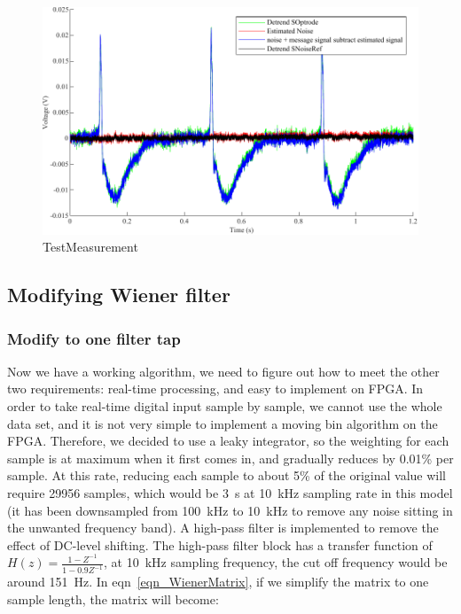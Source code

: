 \begin{figure}[h]
\centering
\includegraphics[width=1\linewidth]{4-ANC_Sys/TestMeasurement.pdf}
\caption{TestMeasurement}
\label{fig_TestMeasurement}
\end{figure}

\subsection{Modifying Wiener filter}

\subsubsection{Modify to one filter tap}

Now we have a working algorithm, we need to figure out how to meet the other two requirements: real-time processing, and easy to implement on FPGA.  In order to take real-time digital input sample by sample, we cannot use the whole data set, and it is not very simple to implement a moving bin algorithm on the FPGA.  Therefore, we decided to use a leaky integrator, so the weighting for each sample is at maximum when it first comes in, and gradually reduces by 0.01\% per sample.  At this rate, reducing each sample to about 5\% of the original value will require 29956 samples, which would be \qty{3}{s} at \qty{10}{kHz} sampling rate in this model (it has been downsampled from \qty{100}{kHz} to \qty{10}{kHz} to remove any noise sitting in the unwanted frequency band).  A high-pass filter is implemented to remove the effect of DC-level shifting.  The high-pass filter block has a transfer function of $H(z)=\frac{1-Z^{-1}}{1-0.9Z^{-1}}$, at \qty{10}{kHz} sampling frequency, the cut off frequency would be around \qty{151}{Hz}.  In eqn~\ref{eqn_WienerMatrix}, if we simplify the matrix to one sample length, the matrix will become:

